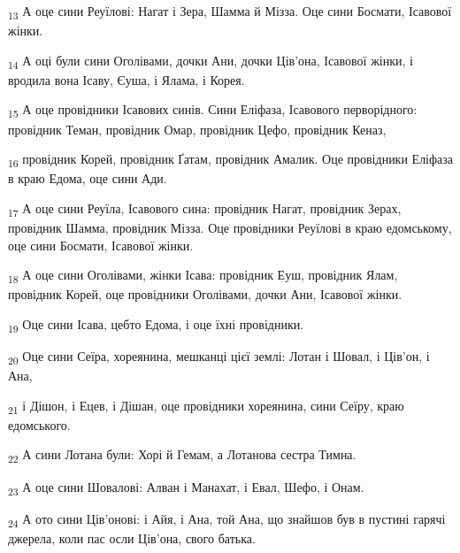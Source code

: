 \begin{tcolorbox}
\textsubscript{13} А оце сини Реуїлові: Нагат і Зера, Шамма й Мізза. Оце сини Босмати, Ісавової жінки.
\end{tcolorbox}
\begin{tcolorbox}
\textsubscript{14} А оці були сини Оголівами, дочки Ани, дочки Ців'она, Ісавової жінки, і вродила вона Ісаву, Єуша, і Ялама, і Корея.
\end{tcolorbox}
\begin{tcolorbox}
\textsubscript{15} А оце провідники Ісавових синів. Сини Еліфаза, Ісавового перворідного: провідник Теман, провідник Омар, провідник Цефо, провідник Кеназ,
\end{tcolorbox}
\begin{tcolorbox}
\textsubscript{16} провідник Корей, провідник Ґатам, провідник Амалик. Оце провідники Еліфаза в краю Едома, оце сини Ади.
\end{tcolorbox}
\begin{tcolorbox}
\textsubscript{17} А оце сини Реуїла, Ісавового сина: провідник Нагат, провідник Зерах, провідник Шамма, провідник Мізза. Оце провідники Реуїлові в краю едомському, оце сини Босмати, Ісавової жінки.
\end{tcolorbox}
\begin{tcolorbox}
\textsubscript{18} А оце сини Оголівами, жінки Ісава: провідник Еуш, провідник Ялам, провідник Корей, оце провідники Оголівами, дочки Ани, Ісавової жінки.
\end{tcolorbox}
\begin{tcolorbox}
\textsubscript{19} Оце сини Ісава, цебто Едома, і оце їхні провідники.
\end{tcolorbox}
\begin{tcolorbox}
\textsubscript{20} Оце сини Сеїра, хореянина, мешканці цієї землі: Лотан і Шовал, і Ців'он, і Ана,
\end{tcolorbox}
\begin{tcolorbox}
\textsubscript{21} і Дішон, і Ецев, і Дішан, оце провідники хореянина, сини Сеїру, краю едомського.
\end{tcolorbox}
\begin{tcolorbox}
\textsubscript{22} А сини Лотана були: Хорі й Гемам, а Лотанова сестра Тимна.
\end{tcolorbox}
\begin{tcolorbox}
\textsubscript{23} А оце сини Шовалові: Алван і Манахат, і Евал, Шефо, і Онам.
\end{tcolorbox}
\begin{tcolorbox}
\textsubscript{24} А ото сини Ців'онові: і Айя, і Ана, той Ана, що знайшов був в пустині гарячі джерела, коли пас осли Ців'она, свого батька.
\end{tcolorbox}
